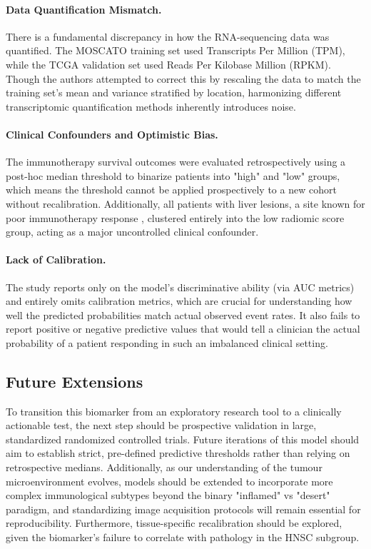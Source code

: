 \documentclass[10pt]{article}
\begin{document}
\paragraph{Data Quantification Mismatch.} There is a fundamental discrepancy in how the RNA-sequencing data was quantified. The MOSCATO training set used Transcripts Per Million (TPM), while the TCGA validation set used Reads Per Kilobase Million (RPKM). Though the authors attempted to correct this by rescaling the data to match the training set's mean and variance stratified by location, harmonizing different transcriptomic quantification methods inherently introduces noise.
\paragraph{Clinical Confounders and Optimistic Bias.} The immunotherapy survival outcomes were evaluated retrospectively using a post-hoc median threshold to binarize patients into "high" and "low" groups, which means the threshold cannot be applied prospectively to a new cohort without recalibration. Additionally, all patients with liver lesions, a site known for poor immunotherapy response \cite{tumeh2017}, clustered entirely into the low radiomic score group, acting as a major uncontrolled clinical confounder.
\paragraph{Lack of Calibration.} The study reports only on the model's discriminative ability (via AUC metrics) and entirely omits calibration metrics, which are crucial for understanding how well the predicted probabilities match actual observed event rates. It also fails to report positive or negative predictive values that would tell a clinician the actual probability of a patient responding in such an imbalanced clinical setting.

\subsection{Future Extensions}
To transition this biomarker from an exploratory research tool to a clinically actionable test, the next step should be prospective validation in large, standardized randomized controlled trials. Future iterations of this model should aim to establish strict, pre-defined predictive thresholds rather than relying on retrospective medians. Additionally, as our understanding of the tumour microenvironment evolves, models should be extended to incorporate more complex immunological subtypes beyond the binary "inflamed" vs "desert" paradigm, and standardizing image acquisition protocols will remain essential for reproducibility. Furthermore, tissue-specific recalibration should be explored, given the biomarker's failure to correlate with pathology in the HNSC subgroup.
\end{document}
